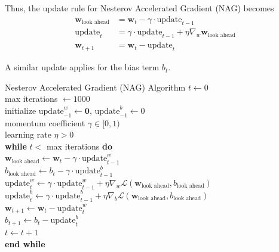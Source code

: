 Thus, the update rule for Nesterov Accelerated Gradient (NAG) becomes
\[
\begin{aligned}
\mathbf{w}_{\text{look ahead}} &= \mathbf{w}_t - \gamma \cdot \text{update}_{t-1} \\
\text{update}_t &= \gamma \cdot \text{update}_{t-1} + \eta \nabla_w \mathbf{w}_{\text{look ahead}} \\
\mathbf{w}_{t+1} &= \mathbf{w}_t - \text{update}_t
\end{aligned}
\]

A similar update applies for the bias term \(b_t\).

\begin{algobox}{Nesterov Accelerated Gradient (NAG) Algorithm}
\( t \gets 0 \) \\
max iterations \( \gets 1000 \) \\
initialize \( \text{update}^w_{-1} \gets \mathbf{0} \), \( \text{update}^b_{-1} \gets 0 \) \\
momentum coefficient \( \gamma \in [0,1) \) \\
learning rate \( \eta > 0 \) \\

\textbf{while} \( t < \) max iterations \textbf{do} \\
\hspace*{1em} \(\mathbf{w}_{\text{look ahead}} \gets \mathbf{w}_t - \gamma \cdot \text{update}^w_{t-1}\) \\
\hspace*{1em} \(b_{\text{look ahead}} \gets b_t - \gamma \cdot \text{update}^b_{t-1}\) \\

\hspace*{1em} \(\text{update}^w_t \gets \gamma \cdot \text{update}^w_{t-1} + \eta \nabla_w \mathcal{L}(\mathbf{w}_{\text{look ahead}}, b_{\text{look ahead}})\) \\
\hspace*{1em} \(\text{update}^b_t \gets \gamma \cdot \text{update}^b_{t-1} + \eta \nabla_b \mathcal{L}(\mathbf{w}_{\text{look ahead}}, b_{\text{look ahead}})\) \\

\hspace*{1em} \(\mathbf{w}_{t+1} \gets \mathbf{w}_t - \text{update}^w_t\) \\
\hspace*{1em} \(b_{t+1} \gets b_t - \text{update}^b_t\) \\
\hspace*{1em} \( t \gets t + 1 \) \\
\textbf{end while}
\end{algobox}

